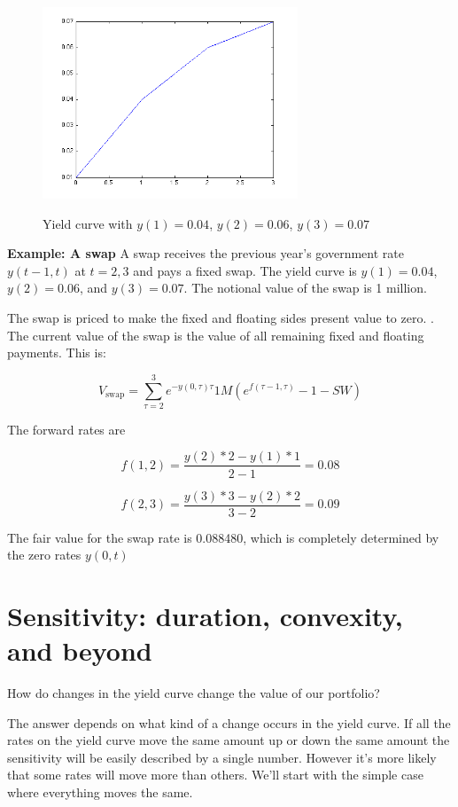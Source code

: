 \begin{figure}[htbp]
\begin{center}
  \includegraphics[width=3in]{pics/simpleYieldCurve.png} \\
  \caption{Yield curve with $y(1) = 0.04$, $y(2)=0.06$, $y(3)=0.07$}
\label{frArb}
\end{center}
\end{figure}

\textbf{Example: A swap} A swap receives the previous year's government rate $y(t-1,t)$ at $t=2,3$ and pays a fixed swap. The yield curve is $y(1) = 0.04$, $y(2) = 0.06$, and $y(3) = 0.07$. The notional value of the swap is 1 million.

The swap is priced to make the fixed and floating sides present value to zero. . The current value of the swap is the value of all remaining fixed and floating payments. This is:

\[V_{\textrm{swap}} = \sum_{\tau=2}^{3}  e^{-y(0,\tau)\tau}1M(e^{f(\tau-1,\tau)}-1 -SW) \]
 
The forward rates are

\[ f(1,2) = \frac{y(2)*2-y(1)*1}{2-1} = 0.08 \]  

\[ f(2,3) = \frac{y(3)*3-y(2)*2}{3-2} = 0.09 \]

The fair value for the swap rate is 0.088480, which is completely determined by the zero rates $y(0,t)$


\section{Sensitivity: duration, convexity, and beyond}
How do changes in the yield curve change the value of our portfolio?

The answer depends on what kind of a change occurs in the yield curve. If all the rates on the yield curve move the same amount up or down the same amount the sensitivity will be easily described by a single number. However it's more likely that some rates will move more than others. We'll start with the simple case where everything moves the same.

